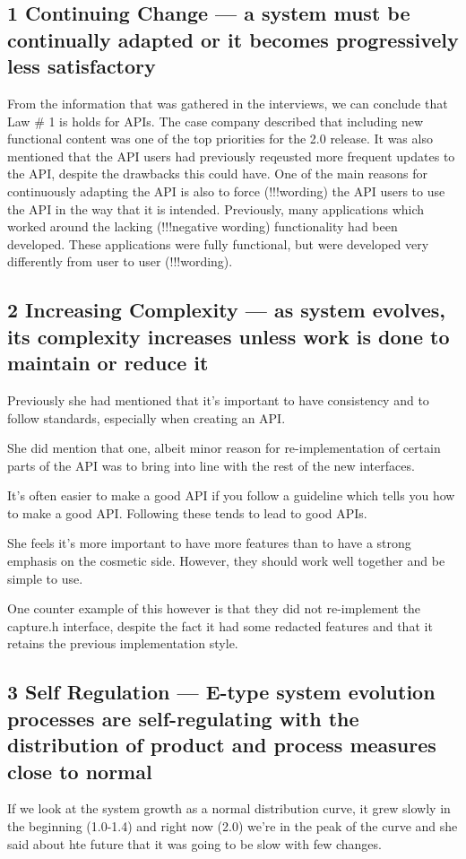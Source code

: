 \documentclass[conference]{IEEEtran}
\begin{document}
\subsection{1 Continuing Change — a system must be continually adapted or it becomes progressively less satisfactory}
From the information that was gathered in the interviews, we can conclude that Law \# 1 is holds for APIs. The case company described that including new functional content was one of the top priorities for the 2.0 release. It was also mentioned that the API users had previously reqeusted more frequent updates to the API, despite the drawbacks this could have. One of the main reasons for continuously adapting the API is also to force (!!!wording) the API users to use the API in the way that it is intended. Previously, many applications which worked around the lacking (!!!negative wording) functionality had been developed. These applications were fully functional, but were developed very differently from user to user (!!!wording). 




\subsection{2 Increasing Complexity — as system evolves, its complexity increases unless work is done to maintain or reduce it}


Previously she had mentioned that it’s important to have consistency and to follow standards, especially when creating an API. 

She did mention that one, albeit minor reason for re-implementation of certain parts of the API was to bring into line with the rest of the new interfaces. 

It’s often easier to make a good API if you follow a guideline which tells you how to make a good API. Following these tends to lead to good APIs.

She feels it’s more important to have more features than to have a strong emphasis on the cosmetic side. However, they should work well together and be simple to use. 

One counter example of this however is that they did not re-implement the capture.h interface, despite the fact it had some redacted features and that it retains the previous implementation style.

\subsection{3 Self Regulation — E-type system evolution processes are self-regulating with the distribution of product and process measures close to normal}
If we look at the system growth as a normal distribution curve, it grew slowly in the beginning (1.0-1.4) and right now (2.0) we're in the peak of the curve and she said about hte future that it was going to be slow with few changes. 
\end{document}
